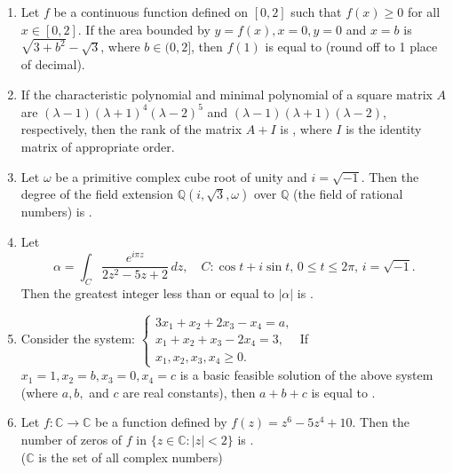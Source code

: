 \documentclass[journal]{IEEEtran}
\numberwithin{equation}{enumi}
\numberwithin{figure}{enumi}
\begin{document}
\begin{enumerate}
\bigskip


\item Let $f$ be a continuous function defined on $[0,2]$ such that $f(x) \geq 0$ for all $x \in [0,2]$. If the area bounded by $y = f(x), x = 0, y = 0$ and $x = b$ is $\sqrt{3 + b^2} - \sqrt{3}$, where $b \in (0,2]$, then $f(1)$ is equal to \underline{\hspace{1cm}} (round off to 1 place of decimal).
\bigskip

\item If the characteristic polynomial and minimal polynomial of a square matrix $A$ are $(\lambda - 1)(\lambda + 1)^4(\lambda - 2)^5$ and $(\lambda - 1)(\lambda + 1)(\lambda - 2)$, respectively, then the rank of the matrix $A + I$ is \underline{\hspace{1cm}}, where $I$ is the identity matrix of appropriate order.
\bigskip

\item Let $\omega$ be a primitive complex cube root of unity and $i = \sqrt{-1}$. Then the degree of the field extension $\mathbb{Q}\left(i, \sqrt{3}, \omega\right)$ over $\mathbb{Q}$ (the field of rational numbers) is \underline{\hspace{1cm}}.
\bigskip

\item Let
\[
\alpha = \int_C \frac{e^{i \pi z}}{2z^2 - 5z + 2} \, dz, \quad C : \cos t + i \sin t, \, 0 \leq t \leq 2\pi, \, i = \sqrt{-1}.
\]
Then the greatest integer less than or equal to $|\alpha|$ is \underline{\hspace{1cm}}.
\bigskip

\item Consider the system:
$
\begin{cases}
3x_1 + x_2 + 2x_3 - x_4 = a, \\
x_1 + x_2 + x_3 - 2x_4 = 3, \\
x_1, x_2, x_3, x_4 \geq 0.
\end{cases}
$
If $x_1 = 1, x_2 = b, x_3 = 0, x_4 = c$ is a basic feasible solution of the above system (where $a, b,$ and $c$ are real constants), then $a + b + c$ is equal to \underline{\hspace{1cm}}.
\bigskip

\item Let $f : \mathbb{C} \to \mathbb{C}$ be a function defined by $f(z) = z^6 - 5z^4 + 10$. Then the number of zeros of $f$ in $\{z \in \mathbb{C} : |z| < 2\}$ is \underline{\hspace{1cm}}. \\
($\mathbb{C}$ is the set of all complex numbers)
\bigskip


\end{enumerate}
\end{document}
